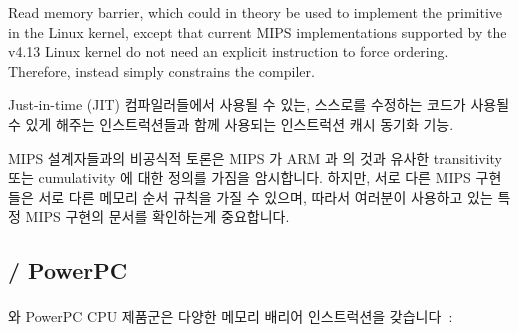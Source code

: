 \begin{description}[style=nextline]
	Read memory barrier, which could in theory be used to implement the
	 primitive in the Linux kernel, except that current
	MIPS implementations supported by the v4.13 Linux kernel do not
	need an explicit instruction to force ordering.
	Therefore,  instead simply constrains the compiler.
	\fi
\item[\tco{SYNCI}]
	Just-in-time (JIT) 컴파일러들에서 사용될 수 있는, 스스로를 수정하는
	코드가 사용될 수 있게 해주는 인스트럭션들과 함께 사용되는 인스트럭션
	캐시 동기화 기능.

\end{description}

MIPS 설계자들과의 비공식적 토론은 MIPS 가 ARM 과 \Power{} 의 것과 유사한
transitivity 또는 cumulativity 에 대한 정의를 가짐을 암시합니다.
하지만, 서로 다른 MIPS 구현들은 서로 다른 메모리 순서 규칙을 가질 수 있으며,
따라서 여러분이 사용하고 있는 특정 MIPS 구현의 문서를 확인하는게 중요합니다.

\subsection{\Power{} / PowerPC}
\label{sec:memorder:POWER / PowerPC}

\Power{} 와 PowerPC\textsuperscript{\textregistered} CPU 제품군은 다양한 메모리
배리어 인스트럭션을 갖습니다~\cite{PowerPC94,MichaelLyons05a}:
\iffalse

